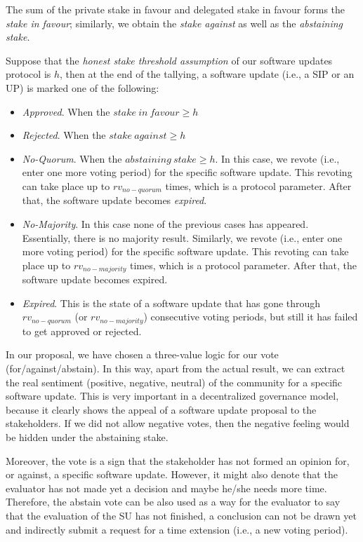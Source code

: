 The sum of the private stake in favour and delegated stake in favour forms the \emph{stake in favour}; similarly, we obtain the \emph{stake against} as well as the \emph{abstaining stake}.

Suppose that the \emph{honest stake threshold assumption} of our software updates protocol is $h$, then at the end of the tallying, a software update (i.e., a SIP or an UP) is marked one of the following:
\begin{itemize}

\item \emph{Approved}. When the $stake\ in\ favour \geq h$

\item \emph{Rejected}. When the $stake\ against \geq h$

\item \emph{No-Quorum}. When the $abstaining\ stake \geq h$. In this case, we revote (i.e., enter one more voting period) for the specific software update. This revoting can take place up to $rv_{no-quorum}$ times, which is a protocol parameter. After that, the software update becomes \emph{expired}.

\item \emph{No-Majority}. In this case none of the previous cases has appeared. Essentially, there is no majority result. Similarly, we revote (i.e., enter one more voting period) for the specific software update. This revoting can take place up to $rv_{no-majority}$ times, which is a protocol parameter. After that, the software update becomes expired.

\item \emph{Expired}. This is the state of a software update that has gone through $rv_{no-quorum}$ (or $rv_{no-majority}$) consecutive voting periods, but still it has failed to get approved or rejected.
\end{itemize}

In our proposal, we have chosen a three-value logic for our vote (for/against/abstain). In this way, apart from the actual result, we can extract the real sentiment (positive, negative, neutral) of the community for a specific software update. This is very important in a decentralized governance model, because it clearly shows the appeal of a software update proposal to the stakeholders. If we did not allow negative votes, then the negative feeling would be hidden under the abstaining stake. 

Moreover, the  vote is a sign that the stakeholder has not formed an opinion for, or against, a specific software update. However, it might also denote that the evaluator has not made yet a decision and maybe he/she needs more time. Therefore, the abstain vote can be also used as a way for the evaluator to say that the evaluation of the SU has not finished, a conclusion can not be drawn yet and indirectly submit a request for a time extension (i.e., a new voting period).


